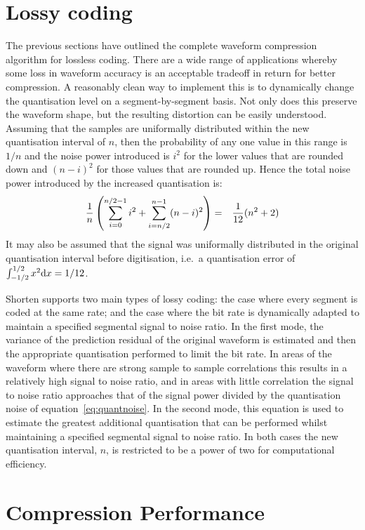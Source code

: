 \section{Lossy coding}

The previous sections have outlined the complete waveform compression
algorithm for lossless coding.  There are a wide range of applications
whereby some loss in waveform accuracy is an acceptable tradeoff in
return for better compression.  A reasonably clean way to implement this
is to dynamically change the quantisation level on a segment-by-segment
basis.  Not only does this preserve the waveform shape, but the
resulting distortion can be easily understood.  Assuming that the
samples are uniformally distributed within the new quantisation interval
of $n$, then the probability of any one value in this range is $1/n$ and
the noise power introduced is $i^2$ for the lower values that are
rounded down and $(n -i)^2$ for those values that are rounded up.  Hence
the total noise power introduced by the increased quantisation is:
\begin{eqnarray}
{1 \over n } \left( \sum_{i=0}^{n / 2 - 1} i^2 + \sum_{i = n/2}^{n - 1}
(n -i)^2 \right) & = & {1 \over 12 } (n^2 + 2) \label{eq:quantnoise}
\end{eqnarray}
It may also be assumed that the signal was uniformally distributed in
the original quantisation interval before digitisation, i.e.\ a
quantisation error of $\int_{-1/2}^{1/2} x^2 {\rm d}x = 1/12$.

Shorten supports two main types of lossy coding: the case where every
segment is coded at the same rate; and the case where the bit rate is
dynamically adapted to maintain a specified segmental signal to noise
ratio.  In the first mode, the variance of the prediction residual of
the original waveform is estimated and then the appropriate quantisation
performed to limit the bit rate.  In areas of the waveform where there
are strong sample to sample correlations this results in a relatively
high signal to noise ratio, and in areas with little correlation the
signal to noise ratio approaches that of the signal power divided by the
quantisation noise of equation~\ref{eq:quantnoise}.  In the second mode,
this equation is used to estimate the greatest additional quantisation
that can be performed whilst maintaining a specified segmental signal to
noise ratio.  In both cases the new quantisation interval, $n$, is
restricted to be a power of two for computational efficiency.

\section{Compression Performance \label{ss:perf}}

